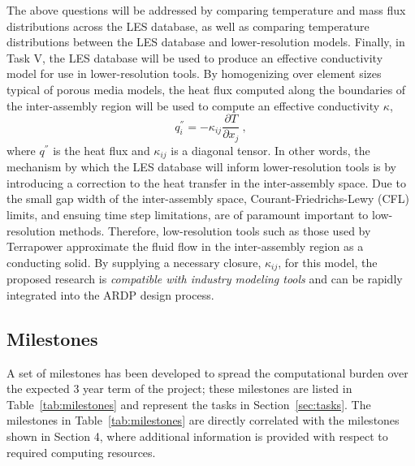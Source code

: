 The above questions will be addressed by comparing temperature and mass flux
distributions across the LES database, as well as comparing temperature
distributions between the LES database and lower-resolution models. Finally, in
Task V, the LES database will be used to produce an effective conductivity
model for use in lower-resolution tools. By homogenizing over element sizes
typical of porous media models, the heat flux computed along the boundaries of
the inter-assembly region will be used to compute an effective conductivity
\(\kappa\),
\begin{equation}
q_i^{''}=-\kappa_{ij}\frac{\partial T}{\partial x_j}\ ,
\end{equation}
where \(q^{''}\) is the heat flux and \(\kappa_{ij}\) is a diagonal tensor. In other words, the mechanism by which the LES database will inform lower-resolution tools is by introducing a correction to the heat transfer in the inter-assembly space. Due to the small gap width of the inter-assembly space, Courant-Friedrichs-Lewy (CFL) limits, and ensuing time step limitations, are of paramount important to low-resolution methods. Therefore, low-resolution tools such as those used by Terrapower \cite{touran} approximate the fluid flow in the inter-assembly region as a conducting solid. By supplying a necessary closure, \(\kappa_{ij}\), for this model, the proposed research is {\it compatible with industry modeling tools} and can be rapidly integrated into the ARDP design process.

\vspace{-.25in}
\subsection{Milestones}
\vspace{-.2in}


A set of milestones has been developed to spread the computational burden over
the expected 3 year term of the project; these milestones are listed in Table~\ref{tab:milestones} and represent the tasks
in Section~\ref{sec:tasks}. The milestones in Table~\ref{tab:milestones} are directly correlated
with the milestones shown in Section 4, where additional information is provided with respect
to required computing resources.

